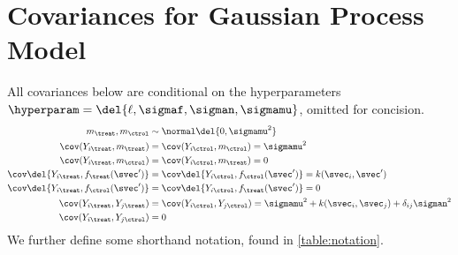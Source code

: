 \section{Covariances for Gaussian Process Model}
\label{sec:covariances}
All covariances below are conditional on the hyperparameters \(\hyperparam = \del{\ell,\sigmaf, \sigman, \sigmamu}\), omitted for concision.
\begin{equation}
    \begin{split}
        m_\treat, m_\ctrol   &\sim \normal\del{0,\sigmamu^2} \\
        \cov(Y_{i\treat},m_\treat)  &= \cov(Y_{i\ctrol},m_\ctrol) = \sigmamu^2 \\
        \cov(Y_{i\treat},m_\ctrol)  &= \cov(Y_{i\ctrol},m_\treat)  = 0 \\
        \cov\del{Y_{i\treat}, f_{\treat}(\svec')} &= \cov\del{Y_{i\ctrol}, f_{\ctrol}(\svec')} = k(\svec_i,\svec') \\
        \cov\del{Y_{i\treat}, f_{\ctrol}(\svec')} &= \cov\del{Y_{i\ctrol}, f_{\treat}(\svec')} = 0 \\
        \cov(Y_{i\treat},Y_{j\treat}) &= \cov(Y_{i\ctrol},Y_{j\ctrol}) = \sigmamu^2 + k(\svec_i,\svec_j) + \delta_{ij}\sigman^2 \\
        \cov(Y_{i\treat},Y_{j\ctrol}) &= 0
    \end{split}
    \label{eq:covariances}
\end{equation}
We further define some shorthand notation, found in \autoref{table:notation}.

